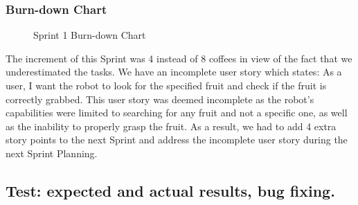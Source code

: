 \subsubsection{Burn-down Chart}\label{sec:sprint1bdc}
\begin{figure}[H]
	\centering
	\vspace{-1mm}
	\caption{Sprint 1 Burn-down Chart}
	\label{fig:sprint1BurndownChart}
\end{figure}

\noindent The increment of this Sprint was 4 instead of 8 coffees in view of the fact that we underestimated the tasks. We have an incomplete user story which states: As a user, I want the robot to look for the specified fruit and check if the fruit is correctly grabbed. This user story was deemed incomplete as the robot's capabilities were limited to searching for any fruit and not a specific one, as well as the inability to properly grasp the fruit. As a result, we had to add 4 extra story points to the next Sprint and address the incomplete user story during the next Sprint Planning.

\subsection{Test: expected and actual results, bug fixing.}

